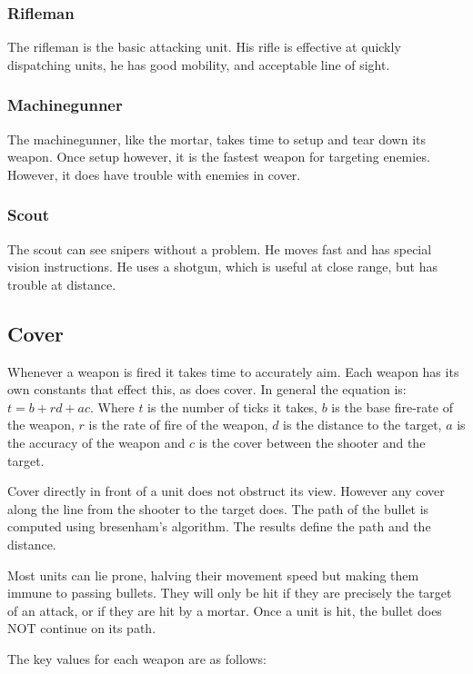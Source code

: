 \documentclass{article}
\begin{document}
\subsubsection*{Rifleman}

The rifleman is the basic attacking unit. His rifle is effective at quickly
dispatching units, he has good mobility, and acceptable line of sight.

\subsubsection*{Machinegunner}

The machinegunner, like the mortar, takes time to setup and tear down its
weapon. Once setup however, it is the fastest weapon for targeting enemies.
However, it does have trouble with enemies in cover.

\subsubsection*{Scout}

The scout can see snipers without a problem. He moves fast and has special
vision instructions. He uses a shotgun, which is useful at close range, but has
trouble at distance.

\subsection*{Cover}

Whenever a weapon is fired it takes time to accurately aim. Each weapon has its
own constants that effect this, as does cover. In general the equation is:
$t=b+rd+ac$.
Where $t$ is the number of ticks it takes, $b$ is the base fire-rate of the
weapon, $r$ is the rate of fire of the weapon, $d$ is the distance to the
target, $a$ is the accuracy of the weapon and $c$ is the cover between the
shooter and the target.

Cover directly in front of a unit does not obstruct its view. However any cover
along the line from the shooter to the target does. The path of the bullet is
computed using bresenham's algorithm. The results define the path and the
distance.

Most units can lie prone, halving their movement speed but making them immune to
passing bullets. They will only be hit if they are precisely the target of an
attack, or if they are hit by a mortar. Once a unit is hit, the bullet does NOT
continue on its path.

The key values for each weapon are as follows:
\end{document}
